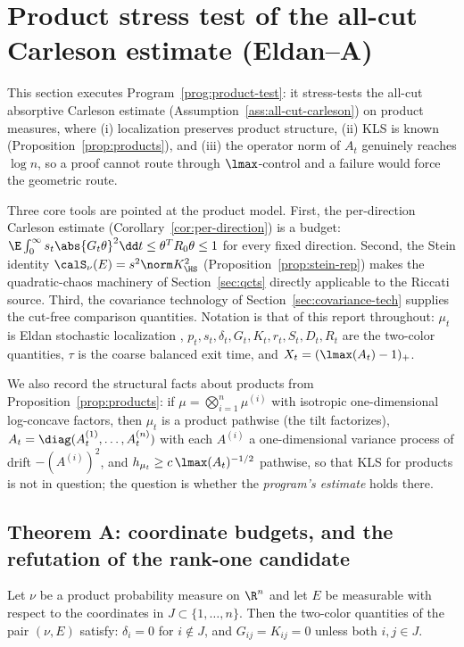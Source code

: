 \documentclass[../../main.tex]{subfiles}
\begin{document}
\section{Product stress test of the all-cut Carleson estimate (Eldan--A)}
\label{sec:product-stress}

This section executes Program~\ref{prog:product-test}: it stress-tests the all-cut absorptive
Carleson estimate (Assumption~\ref{ass:all-cut-carleson}) on product measures, where
(i) localization preserves product structure, (ii) KLS is known
(Proposition~\ref{prop:products}), and (iii) the operator norm of $A_t$ genuinely reaches
$\log n$, so a proof cannot route through $\lmax$-control and a failure would force the
geometric route.

Three core tools are pointed at the product model. First, the per-direction Carleson estimate
(Corollary~\ref{cor:per-direction}) is a budget:
$\E\int_0^\infty s_t\abs{G_t\theta}^2\dd t\le\theta^TR_0\theta\le1$ for every fixed direction.
Second, the Stein identity $\calS_\nu(E)=s^2\norm K_\HS^2$ (Proposition~\ref{prop:stein-rep})
makes the quadratic-chaos machinery of Section~\ref{sec:qcts} directly applicable to the
Riccati source. Third, the covariance technology of Section~\ref{sec:covariance-tech} supplies
the cut-free comparison quantities. Notation is that of this report throughout: $\mu_t$ is
Eldan stochastic localization \cite{Eldan2013ThinShell,LeeVempala2024},
$p_t,s_t,\delta_t,G_t,K_t,r_t,S_t,D_t,R_t$ are the two-color quantities, $\tau$ is the coarse
balanced exit time, and $X_t=(\lmax(A_t)-1)_+$.

We also record the structural facts about products from Proposition~\ref{prop:products}: if
$\mu=\bigotimes_{i=1}^n\mu^{(i)}$ with isotropic one-dimensional log-concave factors, then
$\mu_t$ is a product pathwise (the tilt factorizes), $A_t=\diag(A_t^{(1)},\dots,A_t^{(n)})$
with each $A^{(i)}$ a one-dimensional variance process of drift $-(A^{(i)})^2$, and
$h_{\mu_t}\ge c\,\lmax(A_t)^{-1/2}$ pathwise, so that KLS for products is not in question; the
question is whether the \emph{program's estimate} holds there.

\subsection{Theorem A: coordinate budgets, and the refutation of the rank-one candidate}
\label{sec:budgets}

\begin{lemma}
\label{lem:block}
Let $\nu$ be a product probability measure on $\R^n$ and let $E$ be measurable with respect to
the coordinates in $J\subset\{1,\dots,n\}$. Then the two-color quantities of the pair
$(\nu,E)$ satisfy: $\delta_i=0$ for $i\notin J$, and $G_{ij}=K_{ij}=0$ unless both
$i,j\in J$.
\end{lemma}
\end{document}
